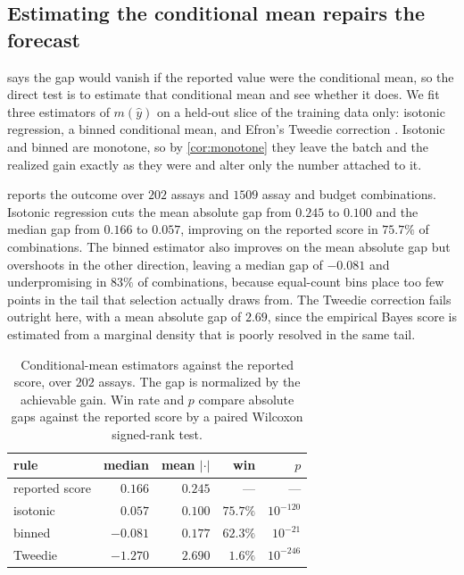 \documentclass{article}
\theoremstyle{plain}
\theoremstyle{definition}
\newcommand{\yhat}{\hat{y}}
\begin{document}
\subsection{Estimating the conditional mean repairs the forecast}
\label{sec:results-condmean}

 says the gap would vanish if the reported value were the conditional
mean, so the direct test is to estimate that conditional mean and see whether it does.
We fit three estimators of $m(\yhat)$ on a held-out slice of the training data only:
isotonic regression, a binned conditional mean, and Efron's Tweedie correction
\citep{efron2011tweedie}. Isotonic and binned are monotone, so by
\cref{cor:monotone} they leave the batch and the realized gain exactly as they were and
alter only the number attached to it.

 reports the outcome over $202$ assays and $1509$ assay and budget
combinations. Isotonic regression cuts the mean absolute gap from $0.245$ to $0.100$
and the median gap from $0.166$ to $0.057$, improving on the reported score in $75.7\%$
of combinations. The binned estimator also improves on the mean absolute gap but
overshoots in the other direction, leaving a median gap of $-0.081$ and underpromising
in $83\%$ of combinations, because equal-count bins place too few points in the tail
that selection actually draws from. The Tweedie correction fails outright here, with a
mean absolute gap of $2.69$, since the empirical Bayes score is estimated from a
marginal density that is poorly resolved in the same tail.

\begin{table}[t]
\caption{Conditional-mean estimators against the reported score, over $202$ assays.
The gap is normalized by the achievable gain. Win rate and $p$ compare absolute gaps
against the reported score by a paired Wilcoxon signed-rank test.}
\label{tab:condmean}
\vskip 0.1in
\begin{center}
\begin{small}
\begin{tabular}{lrrrr}
\toprule
rule & median & mean $|\cdot|$ & win & $p$ \\
\midrule
reported score & $0.166$ & $0.245$ & --- & --- \\
isotonic       & $0.057$ & $0.100$ & $75.7\%$ & $10^{-120}$ \\
binned         & $-0.081$ & $0.177$ & $62.3\%$ & $10^{-21}$ \\
Tweedie        & $-1.270$ & $2.690$ & $1.6\%$ & $10^{-246}$ \\
\bottomrule
\end{tabular}
\end{small}
\end{center}
\vskip -0.1in
\end{table}
\end{document}
